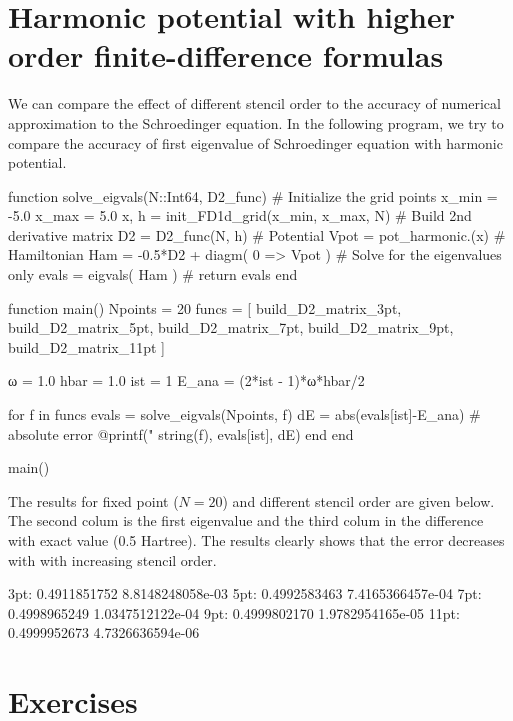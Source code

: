 \section{Harmonic potential with higher order finite-difference formulas}

We can compare the effect of different stencil order to the accuracy of numerical approximation
to the Schroedinger equation. In the following program, we try to compare the accuracy of
first eigenvalue of Schroedinger equation with harmonic potential.

\begin{juliacode}
function solve_eigvals(N::Int64, D2_func)
    # Initialize the grid points
    x_min = -5.0
    x_max =  5.0
    x, h = init_FD1d_grid(x_min, x_max, N)
    # Build 2nd derivative matrix
    D2 = D2_func(N, h)
    # Potential
    Vpot = pot_harmonic.(x)
    # Hamiltonian
    Ham = -0.5*D2 + diagm( 0 => Vpot )
    # Solve for the eigenvalues only
    evals = eigvals( Ham )
    #
    return evals
end

function main()
    Npoints = 20
    funcs = [
      build_D2_matrix_3pt, build_D2_matrix_5pt,
      build_D2_matrix_7pt, build_D2_matrix_9pt,
      build_D2_matrix_11pt
    ]

    ω = 1.0
    hbar = 1.0
    ist = 1
    E_ana = (2*ist - 1)*ω*hbar/2

    for f in funcs
        evals = solve_eigvals(Npoints, f)
        dE = abs(evals[ist]-E_ana) # absolute error
        @printf("%
          string(f), evals[ist], dE)
    end
end

main()
\end{juliacode}

The results for fixed point ($N=20$) and different stencil order are given below.
The second colum is the first eigenvalue and the third colum in the difference with
exact value (0.5 Hartree). The results clearly shows that the error decreases with
with increasing stencil order.
\begin{textcode}
  3pt:       0.4911851752   8.8148248058e-03
  5pt:       0.4992583463   7.4165366457e-04
  7pt:       0.4998965249   1.0347512122e-04
  9pt:       0.4999802170   1.9782954165e-05
 11pt:       0.4999952673   4.7326636594e-06
\end{textcode}



\section{Exercises}


